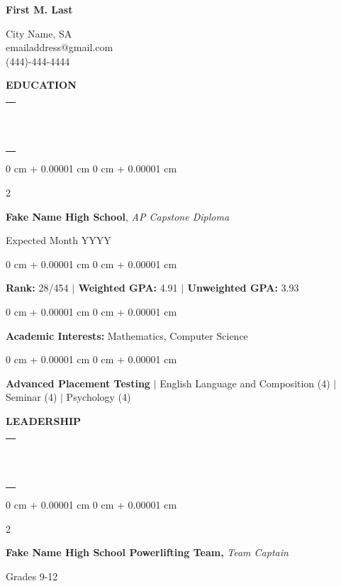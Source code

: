 \documentclass[10pt, letterpaper]{article}
\makeatletter
\newcommand{\sectiondoubleline}[1]{%
  \vspace{0.3cm}
  {\needspace{0.5\baselineskip}\noindent\large\bfseries\color{textColor}#1}\par
  \vspace{-0.55em}
  \noindent\begin{tabular}{@{}p{\textwidth}@{}}
  \textcolor{primaryColor}{\rule{\textwidth}{1.65pt}} \\[-1.7ex]
  \textcolor{secondaryColor}{\rule{\textwidth}{1.65pt}}
  \end{tabular}\par
  \vspace{0.1cm}
}
\newenvironment{onecolentry}{
    \begin{adjustwidth}{
        0 cm + 0.00001 cm
    }{
        0 cm + 0.00001 cm
    }
}{
    \end{adjustwidth}
}
\newenvironment{twocolentry}[2][]{
    \onecolentry
    \def\secondColumn{#2}
    \setcolumnwidth{\fill, 4.5 cm}
    \begin{paracol}{2}
}{
    \switchcolumn \raggedleft \secondColumn
    \end{paracol}
    \endonecolentry
}
\makeatother
\begin{document}
     \newcommand{\AND}{\unskip
        \cleaders\copy\ANDbox\hskip\wd\ANDbox
        \ignorespaces
    }
    \newsavebox\ANDbox
    \sbox\ANDbox{$|$}

    \noindent\begin{minipage}{0.5\textwidth}
        \fontsize{24 pt}{24 pt}\selectfont \textbf{First M. Last}
    \end{minipage}%
    \begin{minipage}{0.5\textwidth}
        \raggedleft
        \hspace{0.2em}\textcolor{primaryColor}{\faMapMarker} City Name, SA\\
        \textcolor{primaryColor}{\faAddressCard[regular]} emailaddress@gmail.com \\ \textcolor{primaryColor}{\faPhone} (444)-444-4444
    \end{minipage}


\sectiondoubleline{EDUCATION \faSchool}

\begin{twocolentry}{
    Expected Month YYYY
}
    \textbf{\textcolor{primaryColor}{\faGraduationCap} \hspace{0.35em}Fake Name High School}, \textit{AP Capstone Diploma}
\end{twocolentry}


\vspace{0.15 cm}
\begin{onecolentry}
 \textbf{Rank:} 28/454 \textbf{$|$ Weighted GPA:} 4.91  \textbf{$|$ Unweighted GPA:} 3.93
\end{onecolentry}

\vspace{0.15 cm}
\begin{onecolentry}
    \textbf{Academic Interests:} Mathematics, Computer Science
\end{onecolentry}

\vspace{0.15 cm}
\begin{onecolentry}
\textbf{Advanced Placement Testing \faBookOpen} $|$ English Language and Composition (4)
$|$ Seminar (4) $|$ Psychology (4)
\end{onecolentry}



\vspace{0.1 cm}
\sectiondoubleline{LEADERSHIP \faUserTie}

\begin{twocolentry}{
    Grades 9-12
}
    \textbf{Fake Name High School Powerlifting Team,} \textit{Team Captain}
\end{twocolentry}
\end{document}
